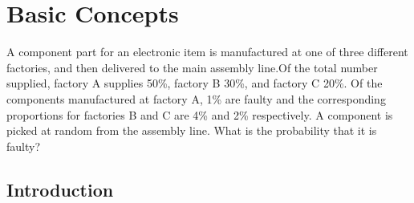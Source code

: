 
\chapter{Basic Concepts}


A component part for an electronic item is
manufactured at one of three different factories, and then delivered to
the main assembly line.Of the total number supplied, factory A supplies
50\%, factory B 30\%, and factory C 20\%. Of the components
manufactured at factory A, 1\% are faulty and the corresponding
proportions for factories B and C are 4\% and 2\% respectively. A
component is picked at random from the assembly line. What is the
probability that it is faulty? 

\section{Introduction}\label{intro}%
